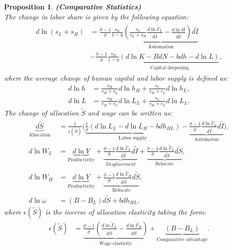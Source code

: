 \documentclass[12pt]{article}
\newtheorem{proposition}{Proposition}
\begin{document}
\begin{proposition}{\bf (Comparative Statistics)} \\
The change in labor share is given by the following equation: 
\begin{align}
\label{ds_L}
\begin{split}
d\ln(s_{L}+s_{H}) &= \frac{\hat{\sigma}-1}{\hat{\sigma}}\frac{s_K}{1-\eta}\underbrace{( \frac{s_L}{s_L+s_H}\frac{d\ln\tilde{\Gamma}_L}{d\tilde{I}}-\frac{d\ln H}{d\tilde{I}})d\tilde{I}}_{\text{Automation}}\\
&-\frac{\hat{\sigma}-1}{\hat{\sigma}}\frac{s_K}{1-\eta}\underbrace{(d\ln K -BdN-bdh-d\ln L)}_{\text{Capital deepening}},
 \end{split}
\end{align}
where the average change of human capital and labor supply is defined as: 
\begin{align*}
d\ln h &= \frac{s_H}{s_H+s_L}d\ln h_H+\frac{s_L}{s_H+s_L}d\ln h_L,\\
d\ln L &= \frac{s_H}{s_H+s_L}d\ln L_L+\frac{s_L}{s_H+s_L}d\ln L_L.
\end{align*}
The change of allocation $\tilde{S}$ and wage can be written as: 
\begin{align}
\label{dS}
\underbrace{d\tilde{S}}_{\text{Allocation}} &= \frac{1}{\epsilon(\tilde{S})}\Big(\underbrace{\frac{1}{\hat{\sigma}}(d\ln L_L-d\ln L_H-bdh_{HL})}_{\text{Labor supply}}-\underbrace{\frac{\hat{\sigma}-1}{\hat{\sigma}}\frac{d\ln\tilde{\Gamma}_L}{d\tilde{I}}d\tilde{I}}_{\text{Automaton}}\Big),\\ 
\label{dW_L}
d \ln W_L &= \underbrace{d \ln Y}_{\text{Productivity}} + \underbrace{\frac{\hat{\sigma}-1}{\hat{\sigma}}\frac{d\ln\tilde{\Gamma}_L}{d\tilde{I}}d\tilde{I}}_{Displacement}+ \underbrace{\frac{\hat{\sigma}-1}{\hat{\sigma}}\frac{d\ln\tilde{\Gamma}_L}{d\tilde{S}}d\tilde{S}}_{\text{Relocate}},\\
\label{dW_H}
d \ln W_H &= \underbrace{d \ln Y}_{\text{Productivity}}  + \underbrace{\frac{\hat{\sigma}-1}{\hat{\sigma}}\frac{d\ln\tilde{\Gamma}_H}{d\tilde{S}}d\tilde{S}}_{\text{Relocate}}, \\
\label{dw}
d \ln \omega &=(B-B_L)d\tilde{S}+bdh_{HL},
\end{align}
where $\epsilon(\tilde{S})$ is the inverse of allocation elasticity taking the form:  
\begin{align}
\label{eS}
\epsilon(\tilde{S})&= \underbrace{\frac{\hat{\sigma}-1}{\hat{\sigma}}(\frac{d\ln \tilde{\Gamma}_L}{d\tilde{S}}-\frac{d\ln \tilde{\Gamma}_H}{d\tilde{S}})}_{\text{Wage elasticity}}
								 +\underbrace{(B-B_L)}_{\text{Comparative advantage}}.
\end{align}
\end{proposition}
\end{document}
